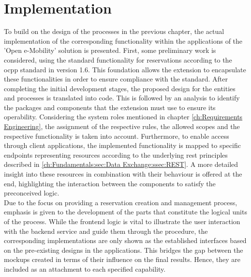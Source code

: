 
\chapter{Implementation}
\label{ch:Implementation}

To build on the design of the processes in the previous chapter, the actual implementation of the corresponding functionality within the applications of the 'Open e-Mobility' solution \cite{noauthor_open_2023} is presented.
First, some preliminary work is considered, using the standard functionality for reservations according to the \acrshort{ocpp} standard in version 1.6.
This foundation allows the extension to encapsulate these functionalities in order to ensure compliance with the standard.
After completing the initial development stages, the proposed design for the entities and processes is translated into code. This is followed by an analysis to identify the packages and components that the extension must use to ensure its operability.
Considering the system roles mentioned in chapter \ref{ch:Requirements Engineering}, the assignment of the respective rules, the allowed scopes and the respective functionality is taken into account.
Furthermore, to enable access through client applications, the implemented functionality is mapped to specific endpoints representing resources according to the underlying \acrshort{rest} principles described in \ref{ch:Fundamentals:sec:Data Exchange:ssec:REST}.
A more detailed insight into these resources in combination with their behaviour is offered at the end, highlighting the interaction between the components to satisfy the preconceived logic. \\
\noindent Due to the focus on providing a reservation creation and management process, emphasis is given to the development of the parts that constitute the logical units of the process. 
While the frontend logic is vital to illustrate the user interaction with the backend service and guide them through the procedure, the corresponding implementations are only shown as the established interfaces based on the pre-existing designs in the applications.
This bridges the gap between the mockups created in terms of their influence on the final results. Hence, they are included as an attachment to each specified capability. 
